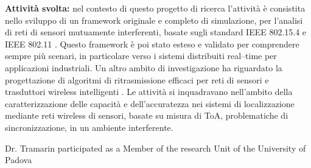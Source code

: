 {\textbf{Attività svolta:} nel contesto di questo progetto di ricerca l'attività è consistita nello sviluppo di un framework originale e completo di simulazione, per l’analisi di reti di sensori mutuamente interferenti, basate sugli standard IEEE 802.15.4 e IEEE 802.11 \cite{De-Dominicis:2009,Bertocco:2010a,Bertocco:2011a}. Questo framework è poi stato esteso e validato per comprendere sempre più scenari, in particolare verso i sistemi distribuiti real--time per applicazioni industriali.
Un altro ambito di investigazione ha riguardato la progettazione di algoritmi di ritrasmissione efficaci per reti di sensori e trasduttori wireless intelligenti \cite{Gamba:2009,Gamba:2010}.
Le attività si inquadravano nell’ambito della caratterizzazione delle capacità e dell’accuratezza nei sistemi di localizzazione mediante reti wireless di sensori, basate su misura di ToA, problematiche di sincronizzazione, in un ambiente interferente.}

    {Dr. Tramarin participated as a Member of the research Unit of the University of Padova}

\longerCventry